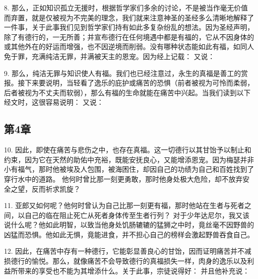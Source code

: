 8. 那么，正如知识孤立无援时，根据哲学家们多余的讨论，不是被当作毫无价值而弃置，就是仅被视为不完美的理念，我们就来注意神圣的圣经多么清晰地解释了一件事，关于此事我们见到哲学家们持有如此多复杂纷乱的想法。因为圣经声明，除了有德行的，一无所善；并宣布德行在任何境遇中都是有福的，它从不因身体的或其他外在的好运而增强，也不因逆境而削弱。没有哪种状态能如此有福，如同人免于罪，充满纯洁无罪，并满被天主的恩宠。因为经上记载： 又说：\par

9. 那么，纯洁无罪与知识使人有福。我们也已经注意过，永生的真福是善工的赏报。接下来要说明，当轻看了逸乐的庇护或痛苦的恐惧（前者被视为可怜而柔弱，后者被视为不丈夫而软弱），那么有福的生命就能在痛苦中兴起。当我们读到以下经文时，这很容易说明： 又说：\par


\subsection{第4章}

\par

10. 因此，即使在痛苦与悲伤之中，也存在真福。这一切德行以其甘饴予以制止和约束，因为它在天然的助佑中充裕，既能安抚良心，又能增添恩宠。因为梅瑟并非小有福气，那时他被埃及人包围，被海困住，却因自己的功绩为自己和百姓找到了穿行水中的道路。 他何时曾比那一刻更勇敢，那时他身处极大危险，却不放弃安全之望，反而祈求凯旋？\par

11. 亚郎又如何呢？他何时曾认为自己比那一刻更有福，那时他站在生者与死者之间，以自己的临在阻止死亡从死者身体传至生者行列？ 对于少年达尼尔，我又该说什么呢？他如此明智，以致当他身处饥肠辘辘的猛狮之中时，竟丝毫不因野兽的凶猛而恐惧。他如此无惧，竟能进食，并不担心自己的榜样会激起野兽吞食自己。\par

12. 因此，在痛苦中存有一种德行，它能彰显善良心的甘饴，因而证明痛苦并不减损德行的愉悦。那么，就像痛苦不会导致德行的真福损失一样，肉身的逸乐以及利益所带来的享受也不能为其增添什么。关于此事，宗徒说得好： 并且他补充说：\par

